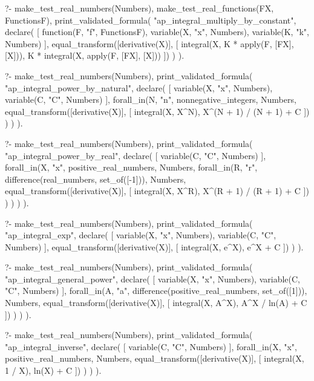 \begin{prolog}
?-	make_test_real_numbers(Numbers),
	make_test_real_functions(FX, FunctionsF),
	print_validated_formula(
		"ap_integral_multiply_by_constant",
		declare(
			[
				function(F, "f", FunctionsF),
				variable(X, "x", Numbers),
				variable(K, "k", Numbers)
			],
			equal_transform([derivative(X)], [
				integral(X, K * apply(F, [FX], [X])),
				K * integral(X, apply(F, [FX], [X]))
			])
		)
	).
\end{prolog}

\begin{prolog}
?-	make_test_real_numbers(Numbers),
	print_validated_formula(
		"ap_integral_power_by_natural",
		declare(
			[
				variable(X, "x", Numbers),
				variable(C, "C", Numbers)
			],
			forall_in(N, "n", nonnegative_integers, Numbers,
				equal_transform([derivative(X)], [
					integral(X, X^N),
					X^(N + 1) / (N + 1) + C
				])
			)
		)
	).
\end{prolog}

\begin{prolog}
?-	make_test_real_numbers(Numbers),
	print_validated_formula(
		"ap_integral_power_by_real",
		declare(
			[
				variable(C, "C", Numbers)
			],
			forall_in(X, "x", positive_real_numbers, Numbers,
				forall_in(R, "r", difference(real_numbers, set_of([-1])), Numbers,
					equal_transform([derivative(X)], [
						integral(X, X^R),
						X^(R + 1) / (R + 1) + C
					])
				)
			)
		)
	).
\end{prolog}

\begin{prolog}
?-	make_test_real_numbers(Numbers),
	print_validated_formula(
		"ap_integral_exp",
		declare(
			[
				variable(X, "x", Numbers),
				variable(C, "C", Numbers)
			],
			equal_transform([derivative(X)], [
				integral(X, e^X),
				e^X + C
			])
		)
	).
\end{prolog}

\begin{prolog}
?-	make_test_real_numbers(Numbers),
	print_validated_formula(
		"ap_integral_general_power",
		declare(
			[
				variable(X, "x", Numbers),
				variable(C, "C", Numbers)
			],
			forall_in(A, "a", difference(positive_real_numbers, set_of([1])), Numbers,
				equal_transform([derivative(X)], [
					integral(X, A^X),
					A^X / ln(A) + C
				])
			)
		)
	).
\end{prolog}


\begin{prolog}
?-	make_test_real_numbers(Numbers),
	print_validated_formula(
		"ap_integral_inverse",
		declare(
			[
				variable(C, "C", Numbers)
			],
			forall_in(X, "x", positive_real_numbers, Numbers,
				equal_transform([derivative(X)], [
					integral(X, 1 / X),
					ln(X) + C
				])
			)
		)
	).
\end{prolog}
